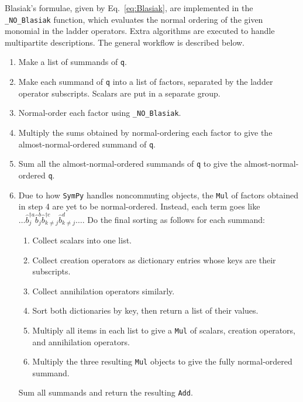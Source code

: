 \documentclass[5p, twocolumn, 10pt, sort&compress]{elsarticle}
\newcommand{\inlinecode}[1]{\texttt{#1}}
\newcommand{\bop}{\hat{b}}
\newcommand{\bdagn}[1]{\bop^{\dagger {#1}}}
\begin{document}
Blasiak's formulae, given by Eq.~\eqref{eq:Blasiak}, are implemented in the \inlinecode{_NO_Blasiak} function, which evaluates the normal ordering of the given monomial in the ladder operators.  Extra algorithms are executed to handle multipartite descriptions.  The general workflow is described below.
\begin{enumerate}
    \item Make a list of summands of \inlinecode{q}.
    
    \item Make each summand of \inlinecode{q} into a list of factors, separated by the ladder operator subscripts. Scalars are put in a separate group.
    
    \item Normal-order each factor using \inlinecode{_NO_Blasiak}.
    
    \item Multiply the sums obtained by normal-ordering each factor to give the almost-normal-ordered summand of \inlinecode{q}. 
    
    \item Sum all the almost-normal-ordered summands of \inlinecode{q} to give the almost-normal-ordered \inlinecode{q}.
    
    \item Due to how \texttt{SymPy} handles noncommuting objects, the \inlinecode{Mul} of factors obtained in step 4 are yet to be normal-ordered. Instead, each term goes like $\dots \bdagn{a}_j\bop^b_j\bdagn{c}_{k\neq j}\bop^{d}_{k\neq j}\dots$. Do the final sorting as follows for each summand:
    \begin{enumerate}
        \item Collect scalars into one list.
        \item Collect creation operators as dictionary entries whose keys are their subscripts.
        \item Collect annihilation operators similarly.
        \item Sort both dictionaries by key, then return a list of their values. 
        \item Multiply all items in each list to give a \inlinecode{Mul} of scalars, creation operators, and annihilation operators.
        \item Multiply the three resulting \inlinecode{Mul} objects to give the fully normal-ordered summand.
    \end{enumerate}
    Sum all summands and return the resulting \inlinecode{Add}. 
\end{enumerate}
\end{document}
